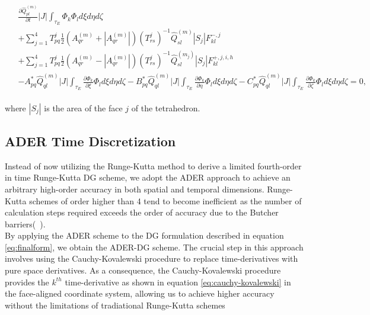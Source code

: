 \begin{align}
    \begin{split}
        & \frac{\partial \hat{Q}_{pl}^{\left(m\right)}}{\partial t} \left|J\right| \int_{\tau_E} \Phi_k \Phi_l d\xi d\eta d\zeta \\
        & + \sum_{j=1}^4 T_{pq}^j \frac{1}{2} \left(A_{qr}^{\left(m\right)} + \left| A_{qr}^{\left(m\right)}\right| \right) \left(T_{rs}^j\right)^{-1} \hat{Q}_{sl}^{\left(m\right)} \left|S_j\right| F_{kl}^{-,j} \\
        & + \sum_{j=1}^4 T_{pq}^j \frac{1}{2} \left(A_{qr}^{\left(m\right)} - \left| A_{qr}^{\left(m\right)}\right| \right) \left(T_{rs}^j\right)^{-1} \hat{Q}_{sl}^{\left(m_j\right)}\left|S_j\right| F_{kl}^{+,j,i,h} \\ 
        & - A_{pq}^* \hat{Q}_{ql}^{\left(m\right)} \left|J\right| \int_{\tau_E} \frac{\partial \Phi_k}{\partial \xi} \Phi_l d\xi d\eta d\zeta
        - B_{pq}^* \hat{Q}_{ql}^{\left(m\right)} \left|J\right| \int_{\tau_E} \frac{\partial \Phi_k}{\partial \eta} \Phi_l d\xi d\eta d\zeta
        - C_{pq}^* \hat{Q}_{ql}^{\left(m\right)} \left|J\right| \int_{\tau_E} \frac{\partial \Phi_k}{\partial \zeta} \Phi_l d\xi d\eta d\zeta = 0,
    \end{split}
    \label{eq:finalform}
\end{align}

where $\left|S_j\right|$ is the area of the face $j$ of the tetrahedron.

\subsection[ADER Time Discretization]{ADER Time Discretization}

Instead of now utilizing the Runge-Kutta method to derive a limited fourth-order in time Runge-Kutta \ac{DG} scheme, we adopt the 
\ac{ADER} approach to achieve an arbitrary high-order accuracy in both spatial and temporal dimensions. Runge-Kutta schemes of order
higher than 4 tend to become inefficient as the number of calculation steps required exceeds the order of accuracy due to the Butcher barriers(~\parencite{butcher1987numerical}). \\

By applying the \ac{ADER} scheme to the \ac{DG} formulation described in equation \ref{eq:finalform}, we obtain the \ac{ADER}-\ac{DG} scheme.
The crucial step in this approach involves using the Cauchy-Kovalewski procedure to replace time-derivatives with pure space derivatives.
As a consequence, the Cauchy-Kovalewski procedure provides the $k^{th}$ time-derivative as shown in equation \ref{eq:cauchy-kovalewski} in the face-aligned coordinate system, allowing us to
achieve higher accuracy without the limitations of tradiational Runge-Kutta schemes

